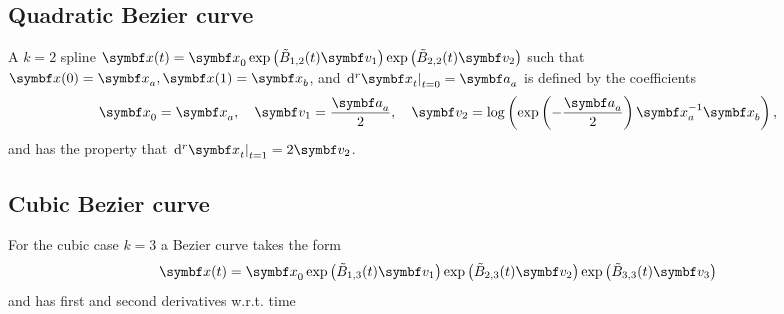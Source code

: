 \subsection{Quadratic Bezier curve} A $k=2$ spline $\x(t) = \x_{0} \exp \left( \tilde B_{1, 2}(t) \symbf v_{1}\right) \exp\left(\tilde B_{2, 2}(t) \symbf v_{2}\right)$ such that $\x(0) = \x_{a}, \x(1) = \x_{b}$, and $\left. \mathrm{d}^{r} \x_{t} \right|_{t=0} = \a_{a}$ is defined by the coefficients
\begin{equation}
  \x_{0}  = \x_{a}, \quad
  \symbf v_{1} = \frac{\a_{a}}{2}, \quad  \symbf v_{2} = \log \left( \exp \left( -\frac{\a_{a}}{2} \right) \x_{a}^{-1} \x_{b} \right),
\end{equation}
and has the property that $\left. \mathrm{d}^{r} \x_{t} \right|_{t=1} = 2 \symbf v_{2}$.

\subsection{Cubic Bezier curve} For the cubic case $k = 3$ a Bezier curve takes the form
\begin{equation}
  \x(t) = \x_{0} \exp \left( \tilde B_{1, 3}(t) \symbf v_{1}\right) \exp\left(\tilde B_{2, 3}(t) \symbf v_{2}\right)\exp\left(\tilde B_{3, 3}(t) \symbf v_{3}\right)
\end{equation}
and has first and second derivatives w.r.t. time
